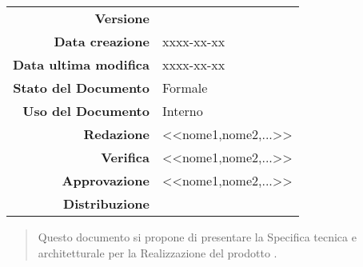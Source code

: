 



\newcommand{\Versione}{\versioneSpecificaTecnica{}}	  %
\newcommand{\Data}{xxxx-xx-xx}						            %
\newcommand{\DataUltimaModifica}{xxxx-xx-xx}
\newcommand{\TipoDocumento}{Norme di Progetto}		    %




\begin{center}
\begin{tabular}{r|l}
\textbf{Versione} & \Versione{} \\
\textbf{Data creazione} & \Data{} \\
\textbf{Data ultima modifica} & \DataUltimaModifica{} \\
\textbf{Stato del Documento} & Formale \\		          %
\textbf{Uso del Documento} & Interno \\			          %
\textbf{Redazione} &  <<nome1,nome2,...>>\\		        %
\textbf{Verifica} & <<nome1,nome2,...>>\\			        %
\textbf{Approvazione} & <<nome1,nome2,...>>\\				 %
\textbf{Distribuzione} & \parbox[t]{4cm}{\NomeGruppo{}}\\
\end{tabular}
\end{center}

\vspace{0.05in}

\begin{abstract}
\begin{center}
Questo documento si propone di presentare la Speciﬁca tecnica e architetturale per la Realizzazione del prodotto \textbf{\Progetto{}}.
\end{center}
\end{abstract}

